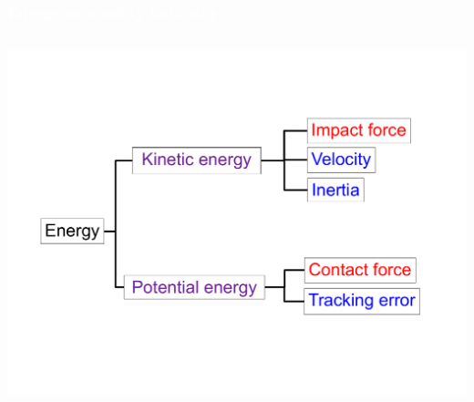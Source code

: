 \begin{frame}[noframenumbering]
\frametitle{{\textcolor{white}{Energy as a safety indicator}}}

\begin{columns}
\column{.95\paperwidth}

\begin{center}                
\includegraphics[width=1\textwidth ]{figures/fin08.pdf}
\end{center}       

\end{columns}

\end{frame}





